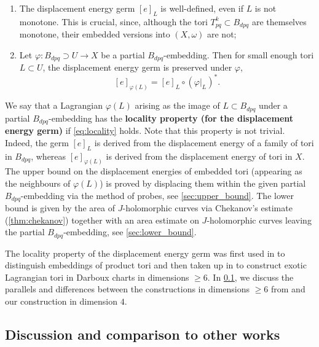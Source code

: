 \documentclass[12pt,a4paper,abstract=true,draft]{scrartcl}
\begin{document}
\begin{enumerate}
    \item The displacement energy germ $[e]_L$ is well-defined, even if $L$ is not monotone.
This is crucial, since, although the tori $T^k_{pq} \subset B_{dpq}$ are themselves monotone, their embedded versions into $(X,\omega)$ are not; 
    \item Let $\varphi \colon B_{dpq} \supset U \rightarrow X$ be a partial $B_{dpq}$-embedding.
Then for small enough tori $L \subset U$, the displacement energy germ is preserved under $\varphi$, 
    \begin{equation}
        \label{eq:locality}
        [e]_{\varphi(L)} = [e]_L \circ (\varphi\vert_L)^*.
    \end{equation}
\end{enumerate}

We say that a Lagrangian $\varphi(L)$ arising as the image of $L \subset B_{dpq}$ under a partial $B_{dpq}$-embedding has the \textbf{locality property (for the displacement energy germ)} if \eqref{eq:locality} holds. Note that this property is not trivial.
Indeed, the germ $[e]_L$ is derived from the displacement energy of a family of tori in $B_{dpq}$, whereas $[e]_{\varphi(L)}$ is derived from the displacement energy of tori in $X$. The upper bound on the displacement energies of embedded tori (appearing as the neighbours of $\varphi(L)$) is proved by displacing them within the given partial $B_{dpq}$-embedding via the method of probes, see \cref{sec:upper_bound}. The lower bound is given by the area of $J$-holomorphic curves via Chekanov's estimate (\cref{thm:chekanov}) together with an area estimate on $J$-holomorphic curves leaving the partial $B_{dpq}$-embedding, see \cref{sec:lower_bound}.

The locality property of the displacement energy germ was first used in \cite{chekanovschlenk2015} to distinguish embeddings of product tori and then taken up in \cite{brendel2023local} to construct exotic Lagrangian tori in Darboux charts in dimensions $\geqslant 6$.
In \cref{sec:intro_discussion}, we discuss the parallels and differences between the constructions in dimensions $\geqslant 6$ from \cite{brendel2023local} and our construction in dimension $4$. 

\subsection{Discussion and comparison to other works}
\label{sec:intro_discussion}
\end{document}
